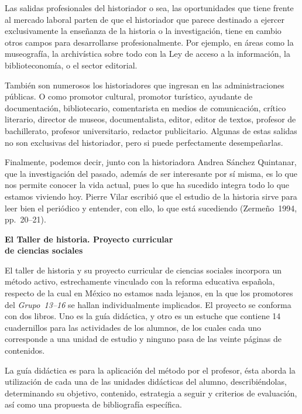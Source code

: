  
Las salidas profesionales del historiador o sea, las oportunidades que 
tiene frente al mercado laboral parten de que el historiador que parece 
destinado a ejercer exclusivamente la enseñanza de la historia o la 
investigación, tiene en cambio otros campos para desarrollarse 
profesionalmente. Por ejemplo, en áreas como la museografía, la 
archivística sobre todo con la Ley de acceso a la información, la 
biblioteconomía, o el sector editorial. 

 
También son numerosos los historiadores que ingresan en las 
administraciones públicas. O como promotor cultural, promotor 
turístico, ayudante de documentación, bibliotecario, comentarista en 
medios de comunicación, crítico literario, director de museos, 
documentalista, editor, editor de textos, profesor de bachillerato, 
profesor universitario, redactor publicitario. Algunas de estas salidas 
no son exclusivas del historiador, pero si puede perfectamente 
desempeñarlas. 

 
Finalmente, podemos decir, junto con la historiadora Andrea Sánchez 
Quintanar, que la investigación del pasado, además de ser interesante 
por sí misma, es lo que nos permite conocer la vida actual, pues lo que 
ha sucedido integra todo lo que estamos viviendo hoy. Pierre Vilar 
escribió que el estudio de la historia sirve para leer bien el 
periódico y entender, con ello, lo que está sucediendo 
(Zermeño~1994, pp.~\mbox{20--21}).


\medskip
\textbf{El Taller de historia. Proyecto curricular\\ de ciencias 
sociales}

 
El taller de historia y su proyecto curricular de ciencias sociales 
incorpora un método activo, estrechamente vinculado con la reforma 
educativa española, respecto de la cual en México no estamos nada 
lejanos, en la que los promotores del \textit{Grupo~13--16} se hallan 
individualmente implicados. El proyecto se conforma con dos libros. Uno 
es la guía didáctica, y otro es un estuche que contiene 14 cuadernillos 
para las actividades de  los alumnos, de los cuales cada uno 
corresponde a una unidad de estudio y ninguno pasa de las veinte 
páginas de contenidos.

 
La guía didáctica es para la aplicación del método por el profesor, 
ésta aborda la utilización de cada una de las unidades didácticas del 
alumno, describiéndolas, determinando su objetivo, contenido, 
estrategia a seguir y criterios de evaluación, así como una propuesta 
de bibliografía específica.

